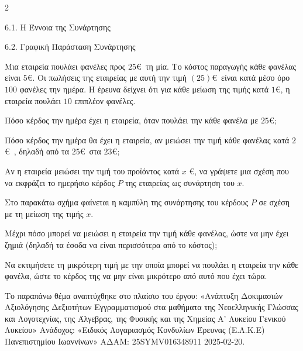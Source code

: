 \begin{ylh}{2}
    \item 6.1. Η Έννοια της Συνάρτησης
    \item 6.2. Γραφική Παράσταση Συνάρτησης
\end{ylh}
Μια εταιρεία πουλάει φανέλες προς $25$\euro\ τη μία. Το κόστος παραγωγής κάθε φανέλας είναι $5$\euro. Οι πωλήσεις της εταιρείας με αυτή την τιμή $(25)$\euro\ είναι κατά μέσο όρο $100$ φανέλες την ημέρα. Η έρευνα δείχνει ότι για κάθε μείωση της τιμής κατά $1$\euro, η εταιρεία πουλάει $10$ επιπλέον φανέλες.
\begin{alist}
\item Πόσο κέρδος την ημέρα έχει η εταιρεία, όταν πουλάει την κάθε φανέλα με $25$\euro;
\item Πόσο κέρδος την ημέρα θα έχει η εταιρεία, αν μειώσει την τιμή κάθε φανέλας κατά $2$\euro\ , δηλαδή από τα $25$\euro\  στα $23$\euro;
\item Αν η εταιρεία μειώσει την τιμή του προϊόντος κατά $x$ \euro, να γράψετε μια σχέση που να εκφράζει το ημερήσιο κέρδος $P$ της εταιρείας ως συνάρτηση του $x$.
\item Στο παρακάτω σχήμα φαίνεται η καμπύλη της συνάρτησης του κέρδους $P$ σε σχέση με τη μείωση της τιμής $x$.
\begin{rlist}
\item
  Μέχρι πόσο μπορεί να μειώσει η εταιρεία την τιμή κάθε φανέλας, ώστε να μην έχει ζημιά (δηλαδή τα έσοδα να είναι περισσότερα από το κόστος);
\item
  Να εκτιμήσετε τη μικρότερη τιμή με την οποία μπορεί να πουλάει η εταιρεία την κάθε φανέλα, ώστε το κέρδος της να μην είναι μικρότερο από αυτό που έχει τώρα.
\end{rlist}
\end{alist}
{\footnotesize Το παραπάνω θέμα αναπτύχθηκε στο πλαίσιο του έργου: «Ανάπτυξη Δοκιμασιών Αξιολόγησης Δεξιοτήτων Εγγραμματισμού στα μαθήματα της Νεοελληνικής Γλώσσας και Λογοτεχνίας, της Άλγεβρας, της Φυσικής και της Χημείας Α' Λυκείου Γενικού Λυκείου» Ανάδοχος: «Ειδικός Λογαριασμός Κονδυλίων Έρευνας (Ε.Λ.Κ.Ε) Πανεπιστημίου Ιωαννίνων» ΑΔΑΜ: 25SYMV016348911 2025-02-20.}

